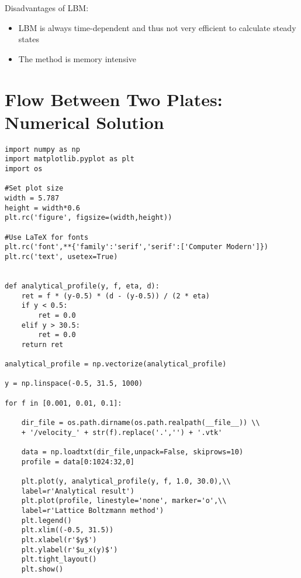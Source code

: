 \documentclass[a4paper,10pt,bibtotoc]{scrartcl}
\begin{document}
Disadvantages of LBM:
\begin{itemize}
 \item LBM is always time-dependent and thus not very efficient to calculate steady states
 \item The method is memory intensive
\end{itemize}


\section{Flow Between Two Plates: Numerical Solution}

\begin{lstlisting}
import numpy as np
import matplotlib.pyplot as plt
import os

#Set plot size
width = 5.787
height = width*0.6
plt.rc('figure', figsize=(width,height))

#Use LaTeX for fonts
plt.rc('font',**{'family':'serif','serif':['Computer Modern']})
plt.rc('text', usetex=True)


def analytical_profile(y, f, eta, d):
    ret = f * (y-0.5) * (d - (y-0.5)) / (2 * eta)
    if y < 0.5:
        ret = 0.0
    elif y > 30.5:
        ret = 0.0
    return ret

analytical_profile = np.vectorize(analytical_profile)

y = np.linspace(-0.5, 31.5, 1000)

for f in [0.001, 0.01, 0.1]:

    dir_file = os.path.dirname(os.path.realpath(__file__)) \\
    + '/velocity_' + str(f).replace('.','') + '.vtk'

    data = np.loadtxt(dir_file,unpack=False, skiprows=10)
    profile = data[0:1024:32,0]

    plt.plot(y, analytical_profile(y, f, 1.0, 30.0),\\
    label=r'Analytical result')
    plt.plot(profile, linestyle='none', marker='o',\\
    label=r'Lattice Boltzmann method')
    plt.legend()
    plt.xlim((-0.5, 31.5))
    plt.xlabel(r'$y$')
    plt.ylabel(r'$u_x(y)$')
    plt.tight_layout()
    plt.show()
\end{lstlisting}
\end{document}
